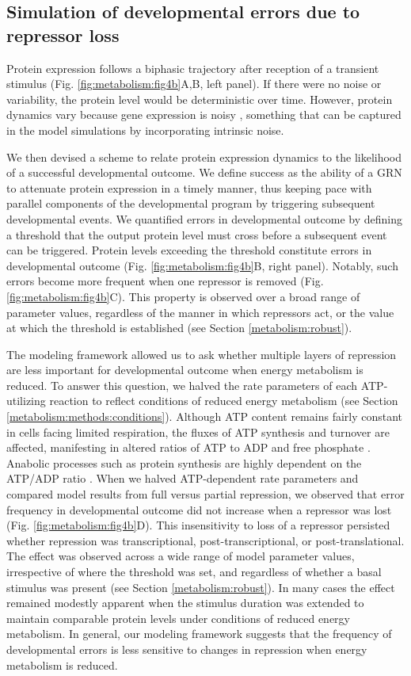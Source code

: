 \subsection{Simulation of developmental errors due to repressor loss}
\label{metabolism:model}

Protein expression follows a biphasic trajectory after reception of a transient stimulus (Fig. \ref{fig:metabolism:fig4b}A,B, left panel). If there were no noise or variability, the protein level would be deterministic over time. However, protein dynamics vary because gene expression is noisy \cite{Arias2006}, something that can be captured in the model simulations by incorporating intrinsic noise.

We then devised a scheme to relate protein expression dynamics to the likelihood of a successful developmental outcome. We define success as the ability of a GRN to attenuate protein expression in a timely manner, thus keeping pace with parallel components of the developmental program by triggering subsequent developmental events. We quantified errors in developmental outcome by defining a threshold that the output protein level must cross before a subsequent event can be triggered. Protein levels exceeding the threshold constitute errors in developmental outcome (Fig. \ref{fig:metabolism:fig4b}B, right panel). Notably, such errors become more frequent when one repressor is removed (Fig. \ref{fig:metabolism:fig4b}C). This property is observed over a broad range of parameter values, regardless of the manner in which repressors act, or the value at which the threshold is established (see Section \ref{metabolism:robust}).

The modeling framework allowed us to ask whether multiple layers of repression are less important for developmental outcome when energy metabolism is reduced. To answer this question, we halved the rate parameters of each ATP-utilizing reaction to reflect conditions of reduced energy metabolism (see Section \ref{metabolism:methods:conditions}). Although ATP content remains fairly constant in cells facing limited respiration, the fluxes of ATP synthesis and turnover are affected, manifesting in altered ratios of ATP to ADP and free phosphate \cite{Brown1992}. Anabolic processes such as protein synthesis are highly dependent on the ATP/ADP ratio \cite{Atkinson1977}. When we halved ATP-dependent rate parameters and compared model results from full versus partial repression, we observed that error frequency in developmental outcome did not increase when a repressor was lost (Fig. \ref{fig:metabolism:fig4b}D). This insensitivity to loss of a repressor persisted whether repression was transcriptional, post-transcriptional, or post-translational. The effect was observed across a wide range of model parameter values, irrespective of where the threshold was set, and regardless of whether a basal stimulus was present (see Section \ref{metabolism:robust}). In many cases the effect remained modestly apparent when the stimulus duration was extended to maintain comparable protein levels under conditions of reduced energy metabolism. In general, our modeling framework suggests that the frequency of developmental errors is less sensitive to changes in repression when energy metabolism is reduced.

